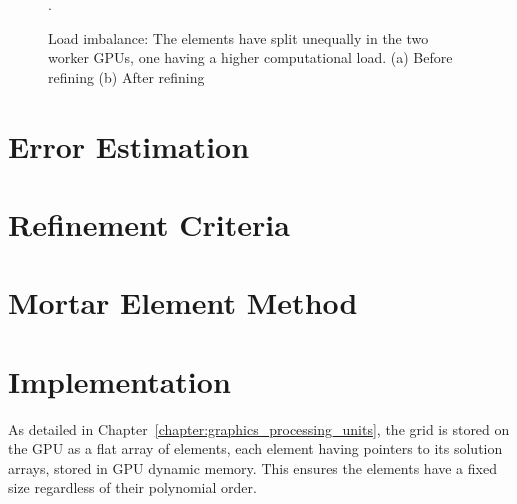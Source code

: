 \begin{figure}[H]
	\centering
	\hfill
	\caption{Load imbalance: The elements have split unequally in the two worker GPUs, one having a higher computational load. (a) Before refining (b) After refining}.
	\label{fig:load_imbalance}
\end{figure}

\section{Error Estimation} \label{section:adaptive_mesh_refinement:error_estimation}

\section{Refinement Criteria} \label{section:adaptive_mesh_refinement:refinement_criteria}

\section{Mortar Element Method} \label{section:adaptive_mesh_refinement:mortar_element_method}

\section{Implementation} \label{section:adaptive_mesh_refinement:implementation}

As detailed in Chapter~\ref{chapter:graphics_processing_units}, the grid is stored on the GPU as a
flat array of elements, each element having pointers to its solution arrays, stored in GPU dynamic
memory. This ensures the elements have a fixed size regardless of their polynomial order.